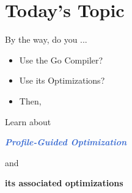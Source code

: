 \section{Today's Topic}
\begin{frame}{By the way, do you ...}
	\pause
	\large
	\begin{itemize}[<+->]
		\item[\emoji{woman-raising-hand}] Use the Go Compiler?

		\item[\large \emoji{woman-raising-hand}] {\large Use its Optimizations?}

		\item[] Then,

	\end{itemize}
\end{frame}

\begin{frame}
	\frametitlesec
	\Large
	\semibf
	\centering

	\pause

	Learn about\pause

	\vspace*{15pt}
	{\bf\it \textcolor{highlight}{Profile-Guided Optimization}}\pause
	\vspace*{6pt}

	and
	\vspace*{10pt}

	\textcolor{subhighlight}{\bf {}its associated optimizations}
\end{frame}
